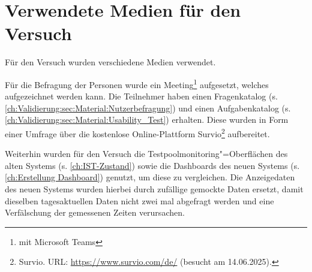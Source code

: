 \section{Verwendete Medien für den Versuch}
\label{ch:Ergebnisse:sec:Material}

Für den Versuch wurden verschiedene Medien verwendet.

Für die Befragung der Personen wurde ein Meeting\footnote{mit Microsoft Teams} aufgesetzt, welches aufgezeichnet werden kann. Die Teilnehmer haben einen Fragenkatalog (s. \autoref{ch:Validierung:sec:Material:Nutzerbefragung}) und einen Aufgabenkatalog (s. \autoref{ch:Validierung:sec:Material:Usability_Test}) erhalten. Diese wurden in Form einer Umfrage über die kostenlose Online-Plattform Survio\footnote{Survio. URL: \url{https://www.survio.com/de/} (besucht am 14.06.2025).} aufbereitet.

Weiterhin wurden für den Versuch die Testpoolmonitoring"=Oberflächen des alten Systems (s. \autoref{ch:IST-Zustand}) sowie die Dash\-boards des neuen Systems (s. \autoref{ch:Erstellung Dashboard}) genutzt, um diese zu vergleichen. Die Anzeigedaten des neuen Systems wurden hierbei durch zufällige gemockte Daten ersetzt, damit dieselben tagesaktuellen Daten nicht zwei mal abgefragt werden und eine Verfälschung der gemessenen Zeiten verursachen.





